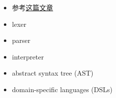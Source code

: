 
\begin{issues}
\issueDraft
\end{issues}

\begin{itemize}
\item 参考\href{https://www.toptal.com/scala/writing-an-interpreter}{这篇文章}
\item lexer
\item parser
\item interpreter
\item abstract syntax tree (AST)
\item domain-specific languages (DSLs)
\end{itemize}
